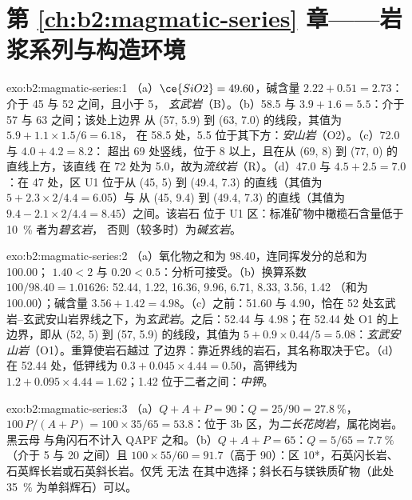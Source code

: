 \section*{第 \ref{ch:b2:magmatic-series} 章——岩浆系列与构造环境}

\begin{solution}{exo:b2:magmatic-series:1}
（a）$\ce{SiO2} = 49.60$，碱含量 $2.22 + 0.51 = 2.73$：介于 45 与 52 之间，且小于 5，
\emph{玄武岩}（B）。（b）58.5 与 $3.9 + 1.6 = 5.5$：介于 57 与 63 之间；该处上边界
从 (57, 5.9) 到 (63, 7.0) 的线段，其值为 $5.9 + 1.1\times1.5/6 = 6.18$，
在 58.5 处，5.5 位于其下方：\emph{安山岩}（O2）。（c）72.0 与 $4.0 + 4.2 = 8.2$：
超出 69 处竖线，位于 8 以上，且在从 (69, 8) 到 (77, 0) 的直线上方，该直线
在 72 处为 5.0，故为\emph{流纹岩}（R）。（d）47.0 与 $4.5 + 2.5 = 7.0$：在 47 处，区 U1
位于从 (45, 5) 到 (49.4, 7.3) 的直线（其值为 $5 + 2.3\times2/4.4 = 6.05$）与
从 (45, 9.4) 到 (49.4, 7.3) 的直线（其值为 $9.4 - 2.1\times2/4.4 = 8.45$）之间。该岩石
位于 U1 区：标准矿物中橄榄石含量低于 \qty{10}{\percent} 者为\emph{碧玄岩}，
否则（较多时）为\emph{碱玄岩}。
\end{solution}

\begin{solution}{exo:b2:magmatic-series:2}
（a）氧化物之和为 98.40，连同挥发分的总和为 100.00；
 $1.40 < 2$ 与  $0.20 < 0.5$：分析可接受。（b）换算系数
$100/98.40 = 1.01626$:  52.44,  1.22,  16.36,
 9.96,  6.71,  8.33,  3.56,  1.42
（和为 100.00）；碱含量 $3.56 + 1.42 = 4.98$。（c）之前：51.60 与 4.90，恰在
52 处玄武岩–玄武安山岩界线之下，为\emph{玄武岩}。之后：52.44 与 4.98；在
52.44 处 O1 的上边界，即从 (52, 5) 到 (57, 5.9) 的线段，其值为 $5 + 0.9\times0.44/5
= 5.08$：\emph{玄武安山岩}（O1）。重算使岩石越过
了边界：靠近界线的岩石，其名称取决于它。（d）在 52.44 处，低钾线为 $0.3 +
0.045\times4.44 = 0.50$，高钾线为 $1.2 + 0.095\times4.44 = 1.62$；1.42
位于二者之间：\emph{中钾}。
\end{solution}

\begin{solution}{exo:b2:magmatic-series:3}
（a）$Q + A + P = 90$：$Q = 25/90 = \qty{27.8}{\percent}$，$100\,P/(A + P) =
100\times35/65 = 53.8$：位于 3b 区，为\emph{二长花岗岩}，属花岗岩。黑云母
与角闪石不计入 QAPF 之和。（b）$Q + A + P = 65$：$Q = 5/65 =
\qty{7.7}{\percent}$（介于 5 与 20 之间）且 $100\times55/60 = 91.7$（高于 90）：区
10*，石英闪长岩、石英辉长岩或石英斜长岩。仅凭 无法
在其中选择；斜长石与镁铁质矿物（此处
\qty{35}{\percent} 为单斜辉石）可以。
\end{solution}


